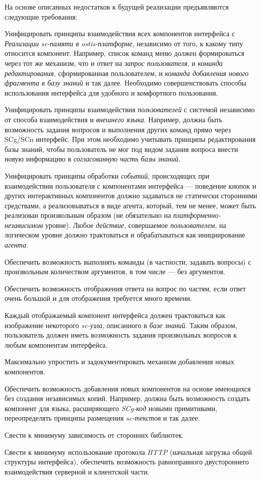 На основе описанных недостатков к будущей реализации предъявляются следующие требования:
\begin{textitemize}
	\item Унифицировать принципы взаимодействия всех компонентов интерфейса с \textit{Реализации sc-памяти в ostis-платформе}, независимо от того, к какому типу относится компонент. Например, список команд меню должен формироваться через тот же механизм, что и ответ на \textit{запрос пользователя}, и \textit{команда редактирования}, сформированная пользователем, и \textit{команда добавления нового фрагмента в базу знаний} и так далее. Необходимо совершенствовать способы использования интерфейса для удобного и комфортного пользования.
	\item Унифицировать принципы взаимодействия \textit{пользователей} с системой независимо от способа взаимодействия и \textit{внешнего языка}. Например, должна быть возможность задания вопросов и выполнения других команд прямо через SCg/SCn интерфейс. При этом необходимо учитывать принципы редактирования базы знаний, чтобы пользователь не мог под видом задания вопроса внести новую информацию в \textit{согласованную часть базы знаний}.
	\item Унифицировать принципы обработки \textit{событий}, происходящих при взаимодействии пользователя с компонентами интерфейса --- поведение кнопок и других интерактивных компонентов должно задаваться не статически сторонними средствами, а реализовываться в виде агента, который, тем не менее, может быть реализован произвольным образом (не обязательно на \textit{платформенно-независимом} уровне). Любое \textit{действие}, совершаемое \textit{пользователем}, на логическом уровне должно трактоваться и обрабатываться как инициирование \textit{агента}.
	\item Обеспечить возможность выполнять команды (в частности, задавать вопросы) с произвольным количеством аргументов, в том числе --- без аргументов.
	\item Обеспечить возможность отображения ответа на вопрос по частям, если ответ очень большой и для отображения требуется много времени.
	\item Каждый отображаемый компонент интерфейса должен трактоваться как изображение некоторого \textit{sc-узла}, описанного в \textit{базе знаний}. Таким образом, пользователь должен иметь возможность задания произвольных вопросов к любым компонентам интерфейса.
	\item Максимально упростить и задокументировать механизм добавления новых компонентов.
	\item Обеспечить возможность добавления новых компонентов на основе имеющихся без создания независимых копий. Например, должна быть возможность создать компонент для языка, расширяющего \textit{SCg-код} новыми примитивами, переопределять принципы размещения \textit{sc-текстов} и так далее.
	\item Свести к минимуму зависимость от сторонних библиотек.
	\item Свести к минимуму использование протокола \textit{HTTP} (начальная загрузка общей структуры интерфейса), обеспечить возможность равноправного двустороннего взаимодействия серверной и клиентской части.
\end{textitemize}


